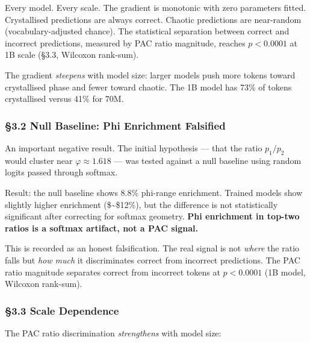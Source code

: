 \documentclass[
  11pt,
  a4paper]{article}
\begin{document}
Every model. Every scale. The gradient is monotonic with zero parameters
fitted. Crystallised predictions are always correct. Chaotic predictions
are near-random (vocabulary-adjusted chance). The statistical separation
between correct and incorrect predictions, measured by PAC ratio
magnitude, reaches \(p < 0.0001\) at 1B scale (§3.3, Wilcoxon rank-sum).

The gradient \emph{steepens} with model size: larger models push more
tokens toward crystallised phase and fewer toward chaotic. The 1B model
has 73\% of tokens crystallised versus 41\% for 70M.

\subsubsection{§3.2 Null Baseline: Phi Enrichment
Falsified}\label{null-baseline-phi-enrichment-falsified}

An important negative result. The initial hypothesis --- that the ratio
\(p_1/p_2\) would cluster near \(\varphi \approx 1.618\) --- was tested
against a null baseline using random logits passed through softmax.

Result: the null baseline shows 8.8\% phi-range enrichment. Trained
models show slightly higher enrichment (\$\sim\$12\%), but the
difference is not statistically significant after correcting for softmax
geometry. \textbf{Phi enrichment in top-two ratios is a softmax
artifact, not a PAC signal.}

This is recorded as an honest falsification. The real signal is not
\emph{where} the ratio falls but \emph{how much} it discriminates
correct from incorrect predictions. The PAC ratio magnitude separates
correct from incorrect tokens at \(p < 0.0001\) (1B model, Wilcoxon
rank-sum).

\subsubsection{§3.3 Scale Dependence}\label{scale-dependence}

The PAC ratio discrimination \emph{strengthens} with model size:
\end{document}
